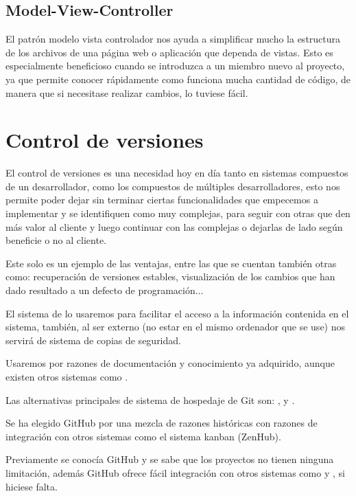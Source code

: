 \subsection{Model-View-Controller}

El patrón modelo vista controlador nos ayuda a simplificar mucho la estructura de los archivos de una página web o aplicación que dependa de vistas. Esto es especialmente beneficioso cuando se introduzca a un miembro nuevo al proyecto, ya que permite conocer rápidamente como funciona mucha cantidad de código, de manera que si necesitase realizar cambios, lo tuviese fácil.


\section{Control de versiones}

El control de versiones es una necesidad hoy en día tanto en sistemas compuestos de un desarrollador, como los compuestos de múltiples desarrolladores, esto nos permite poder dejar sin terminar ciertas funcionalidades que empecemos a implementar y se identifiquen como muy complejas, para seguir con otras que den más valor al cliente y luego continuar con las complejas o dejarlas de lado según beneficie o no al cliente.

Este solo es un ejemplo de las ventajas, entre las que se cuentan también otras como: recuperación de versiones estables, visualización de los cambios que han dado resultado a un defecto de programación...

El sistema de  lo usaremos para facilitar el acceso a la información contenida en el sistema, también, al ser externo (no estar en el mismo ordenador que se use) nos servirá de sistema de copias de seguridad.

Usaremos  por razones de documentación y conocimiento ya adquirido, aunque existen otros sistemas como .

Las alternativas principales de sistema de hospedaje de Git son: ,  y .

Se ha elegido GitHub por una mezcla de razones históricas con razones de integración con otros sistemas como el sistema kanban (ZenHub).

Previamente se conocía GitHub y se sabe que los proyectos  no tienen ninguna limitación, además GitHub ofrece fácil integración con otros sistemas como  y , si hiciese falta.


